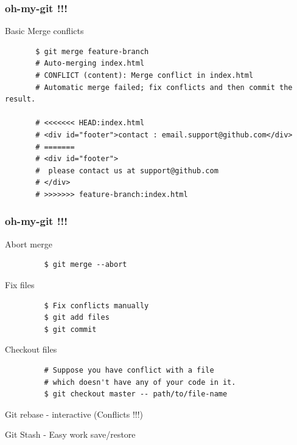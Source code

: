 \documentclass[10pt]{beamer}
\begin{document}
\begin{frame}[fragile]
  \frametitle{oh-my-git !!!}
  \begin{block}{Basic Merge conflicts}
    \begin{verbatim}
       $ git merge feature-branch
       # Auto-merging index.html
       # CONFLICT (content): Merge conflict in index.html
       # Automatic merge failed; fix conflicts and then commit the result.

       # <<<<<<< HEAD:index.html
       # <div id="footer">contact : email.support@github.com</div>
       # =======
       # <div id="footer">
       #  please contact us at support@github.com
       # </div>
       # >>>>>>> feature-branch:index.html
    \end{verbatim}
  \end{block}
\end{frame}

\begin{frame}[fragile]
  \frametitle{oh-my-git !!!}
    \begin{block}{Abort merge}
      \begin{verbatim}
         $ git merge --abort
    \end{verbatim}
    \end{block}
    \pause
    \begin{block}{Fix files}
      \begin{verbatim}
         $ Fix conflicts manually
         $ git add files
         $ git commit
    \end{verbatim}
    \end{block}
     \pause
    \begin{block}{Checkout files}
      \begin{verbatim}
         # Suppose you have conflict with a file
         # which doesn't have any of your code in it.
         $ git checkout master -- path/to/file-name
    \end{verbatim}
    \end{block}
\end{frame}

\begin{frame}
  \begin{center}
    \Huge{Git rebase - interactive (Conflicts !!!)}
  \end{center}
\end{frame}

\begin{frame}
  \begin{center}
    \Huge{Git Stash - Easy work save/restore }
  \end{center}
\end{frame}
\end{document}
